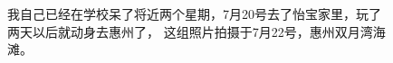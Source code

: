 \documentclass[cn,11pt,chinese]{elegantbook}
\begin{document}
\begin{figure}[h!]
    \caption{我自己已经在学校呆了将近两个星期，7月20号去了怡宝家里，玩了两天以后就动身去惠州了，
    这组照片拍摄于7月22号，惠州双月湾海滩。}
\end{figure}
\end{document}
